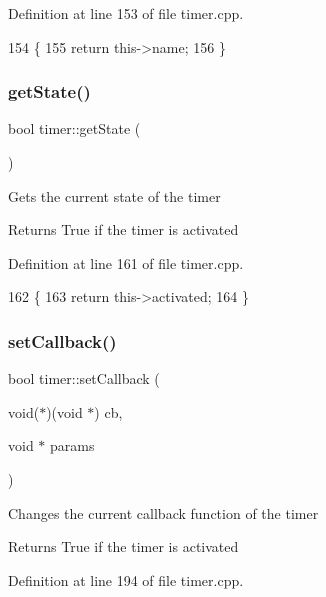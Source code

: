 Definition at line 153 of file timer.\+cpp.


\begin{DoxyCode}
154 \{
155     \textcolor{keywordflow}{return} this->name;
156 \}
\end{DoxyCode}
\mbox{\label{classtimer_a35c72b981bb55b98e979f83a988f434c}} 
\subsubsection{\texorpdfstring{get\+State()}{getState()}}
{\footnotesize\ttfamily bool timer\+::get\+State (\begin{DoxyParamCaption}{ }\end{DoxyParamCaption})}

Gets the current state of the timer \begin{DoxyReturn}{Returns}
True if the timer is activated 
\end{DoxyReturn}


Definition at line 161 of file timer.\+cpp.


\begin{DoxyCode}
162 \{
163     \textcolor{keywordflow}{return} this->activated;
164 \}
\end{DoxyCode}
\mbox{\label{classtimer_a75f1f309bb222687385ede7d2d8233c3}} 
\subsubsection{\texorpdfstring{set\+Callback()}{setCallback()}}
{\footnotesize\ttfamily bool timer\+::set\+Callback (\begin{DoxyParamCaption}\item[{void($\ast$)(void $\ast$)}]{cb,  }\item[{void $\ast$}]{params }\end{DoxyParamCaption})}

Changes the current callback function of the timer \begin{DoxyReturn}{Returns}
True if the timer is activated 
\end{DoxyReturn}


Definition at line 194 of file timer.\+cpp.



